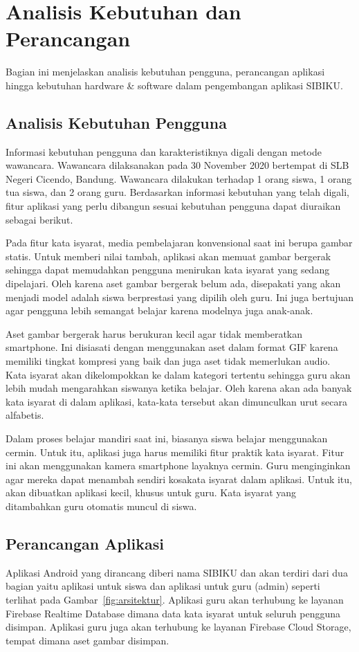 \documentclass[conference,a4paper,10pt]{IEEEtran}
\begin{document}
\newpage
\section{Analisis Kebutuhan dan Perancangan}
Bagian ini menjelaskan analisis kebutuhan pengguna, perancangan aplikasi hingga
kebutuhan hardware \& software dalam pengembangan aplikasi SIBIKU.

\subsection{Analisis Kebutuhan Pengguna}
Informasi kebutuhan pengguna dan karakteristiknya digali dengan metode
wawancara. Wawancara dilaksanakan pada 30 November 2020 bertempat di SLB Negeri
Cicendo, Bandung. Wawancara dilakukan terhadap 1 orang siswa, 1 orang tua
siswa, dan 2 orang guru. Berdasarkan informasi kebutuhan yang telah digali,
fitur aplikasi yang perlu dibangun sesuai kebutuhan pengguna dapat diuraikan
sebagai berikut.

Pada fitur kata isyarat, media pembelajaran konvensional saat ini berupa gambar
statis. Untuk memberi nilai tambah, aplikasi akan memuat gambar bergerak sehingga
dapat memudahkan pengguna menirukan kata isyarat yang sedang dipelajari. Oleh
karena aset gambar bergerak belum ada, disepakati yang akan menjadi model adalah
siswa berprestasi yang dipilih oleh guru. Ini juga bertujuan agar pengguna lebih
semangat belajar karena modelnya juga anak-anak.

Aset gambar bergerak harus berukuran kecil agar tidak memberatkan smartphone.
Ini disiasati dengan menggunakan aset dalam format GIF karena memiliki tingkat
kompresi yang baik dan juga aset tidak memerlukan audio. Kata isyarat akan
dikelompokkan ke dalam kategori tertentu sehingga guru akan lebih mudah
mengarahkan siswanya ketika belajar. Oleh karena akan ada banyak kata isyarat
di dalam aplikasi, kata-kata tersebut akan dimunculkan urut secara alfabetis.

Dalam proses belajar mandiri saat ini, biasanya siswa belajar menggunakan
cermin. Untuk itu, aplikasi juga harus memiliki fitur praktik kata isyarat.
Fitur ini akan menggunakan kamera smartphone layaknya cermin. Guru
menginginkan agar mereka dapat menambah sendiri kosakata isyarat dalam aplikasi.
Untuk itu, akan dibuatkan aplikasi kecil, khusus untuk guru. Kata isyarat yang
ditambahkan guru otomatis muncul di siswa.

\subsection{Perancangan Aplikasi}
Aplikasi Android yang dirancang diberi nama SIBIKU dan akan terdiri dari dua
bagian yaitu aplikasi untuk siswa dan aplikasi untuk guru (admin) seperti
terlihat pada Gambar~\ref{fig:arsitektur}. Aplikasi guru akan terhubung ke
layanan Firebase Realtime Database dimana data kata isyarat untuk seluruh
pengguna disimpan. Aplikasi guru juga akan terhubung ke layanan Firebase Cloud
Storage, tempat dimana aset gambar disimpan.
\end{document}

